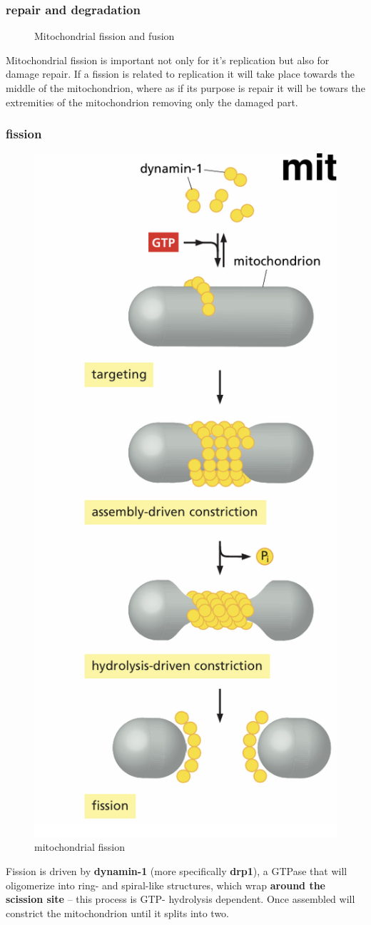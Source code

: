 \documentclass[../main.tex]{subfiles}
\begin{document}
\subsubsection{repair and degradation}
\begin{figure}[H]
	\centering
	\caption{Mitochondrial fission and fusion}
\end{figure}
Mitochondrial fission is important not only for it's replication but also for damage repair. If a fission is related to replication it will take place towards the middle of the mitochondrion, where as if its purpose is repair it will be towars the extremities of the mitochondrion removing only the damaged part.
\subsubsection{fission}
\begin{figure}[H]
    \centering
    \includegraphics[width=0.2\linewidth]{fission.png}
    \caption{mitochondrial fission}
    \label{fig:enter-label}
\end{figure}
Fission is driven by \textbf{\gls{dynamin-1}} (more specifically \textbf{\gls{drp1}}), a GTPase that will  oligomerize into ring- and spiral-like structures, which wrap \textbf{around 
the scission site} – this process is GTP- hydrolysis dependent. Once assembled will constrict the mitochondrion until it splits into two.
\end{document}
